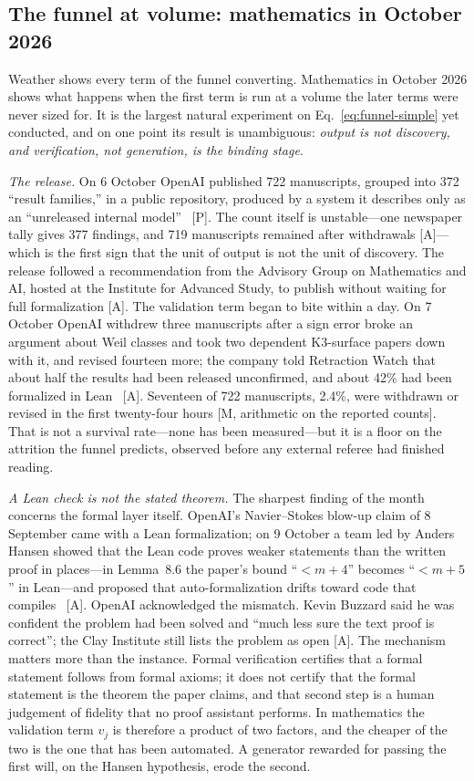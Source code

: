 \subsection{The funnel at volume: mathematics in October 2026}
\label{sec:sci-october-release}

Weather shows every term of the funnel converting. Mathematics in October 2026 shows what happens when the first term is run at a volume the later terms were never sized for. It is the largest natural experiment on Eq.~\eqref{eq:funnel-simple} yet conducted, and on one point its result is unambiguous: \emph{output is not discovery, and verification, not generation, is the binding stage}.

\emph{The release.} On 6 October OpenAI published 722 manuscripts, grouped into 372 ``result families,'' in a public repository, produced by a system it describes only as an ``unreleased internal model''~\cite{sci-rw-openai} [P]. The count itself is unstable---one newspaper tally gives 377 findings, and 719 manuscripts remained after withdrawals [A]---which is the first sign that the unit of output is not the unit of discovery. The release followed a recommendation from the Advisory Group on Mathematics and AI, hosted at the Institute for Advanced Study, to publish without waiting for full formalization [A]. The validation term began to bite within a day. On 7 October OpenAI withdrew three manuscripts after a sign error broke an argument about Weil classes and took two dependent K3-surface papers down with it, and revised fourteen more; the company told Retraction Watch that about half the results had been released unconfirmed, and about 42\% had been formalized in Lean~\cite{sci-rw-openai,sci-sciam-openai} [A]. Seventeen of 722 manuscripts, 2.4\%, were withdrawn or revised in the first twenty-four hours [M, arithmetic on the reported counts]. That is not a survival rate---none has been measured---but it is a floor on the attrition the funnel predicts, observed before any external referee had finished reading.

\emph{A Lean check is not the stated theorem.} The sharpest finding of the month concerns the formal layer itself. OpenAI's Navier--Stokes blow-up claim of 8 September came with a Lean formalization; on 9 October a team led by Anders Hansen showed that the Lean code proves weaker statements than the written proof in places---in Lemma~8.6 the paper's bound ``$<m+4$'' becomes ``$<m+5$'' in Lean---and proposed that auto-formalization drifts toward code that compiles~\cite{sci-navier-lean} [A]. OpenAI acknowledged the mismatch. Kevin Buzzard said he was confident the problem had been solved and ``much less sure the text proof is correct''; the Clay Institute still lists the problem as open [A]. The mechanism matters more than the instance. Formal verification certifies that a formal statement follows from formal axioms; it does not certify that the formal statement is the theorem the paper claims, and that second step is a human judgement of fidelity that no proof assistant performs. In mathematics the validation term $v_j$ is therefore a product of two factors, and the cheaper of the two is the one that has been automated. A generator rewarded for passing the first will, on the Hansen hypothesis, erode the second.

